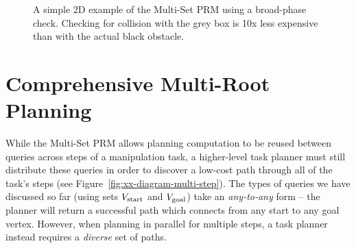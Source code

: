 \begin{figure}
   \caption{A simple 2D example of the Multi-Set PRM using
     a broad-phase check.
     Checking for collision with the grey box is 10x less expensive
     than with the actual black obstacle.
     }
   \label{fig:broad-phase-2d}
\end{figure}


\section{Comprehensive Multi-Root Planning}
\label{chap:cmr}

While the Multi-Set PRM
allows planning computation to be reused between queries
across steps of a manipulation task,
a higher-level task planner must still distribute these queries
in order to discover a low-cost path
through all of the task's steps
(see Figure~\ref{fig:xx-diagram-multi-step}).
The types of queries we have discussed so far
(using sets
$V_{\mbox{\scriptsize start}}$ and $V_{\mbox{\scriptsize goal}}$)
take an \emph{any-to-any} form
-- the planner will return a successful path which connects
from any start to any goal vertex.
However,
when planning in parallel for multiple steps,
a task planner instead requires a \emph{diverse} set of
paths.

